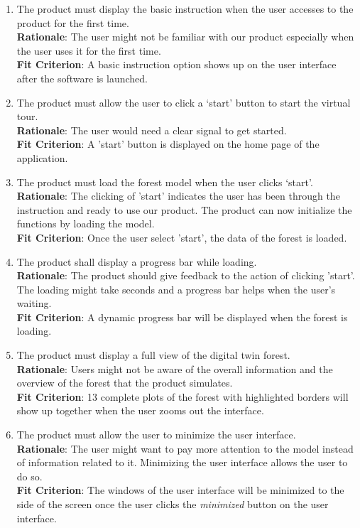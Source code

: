 \documentclass{article}
\begin{document}
\begin{enumerate}[FR1]
	\item The product must display the basic instruction when the user accesses to the product for the first time.\\
	\textbf{Rationale}: The user might not be familiar with our product especially when the user uses it for the first time.\\
	\textbf{Fit Criterion}: A basic instruction 
	option shows up on the user interface after the software is launched. 
	
	\item The product must allow the user to click a ‘start’ button to start the virtual tour.\\
	\textbf{Rationale}: The user would need a clear signal to get started.\\
	\textbf{Fit Criterion}: A 'start' button is displayed on the home page of the application.
	
	\item The product must load the forest model when the user clicks ‘start’.\\
	\textbf{Rationale}: The clicking of 'start' indicates the user has been through the instruction and ready to use our product. The product can now initialize the functions by loading the model.\\
	\textbf{Fit Criterion}: Once the user select 'start', the data of the forest is loaded.
	
	\item The product shall display a progress bar while loading. \\
	\textbf{Rationale}: The product should give feedback to the action of clicking 'start'. The loading might take seconds and a progress bar helps when the user's waiting. \\
	\textbf{Fit Criterion}: A dynamic progress bar will be displayed when the forest is loading.
	
	\item The product must display a full view of the digital twin forest.\\
	\textbf{Rationale}: Users might not be aware of the overall information and the overview of the forest that the product simulates.\\
	\textbf{Fit Criterion}: 13 complete plots of the forest with highlighted borders will show up together when the user zooms out the interface.
    
    \item The product must allow the user to minimize the user interface. \\
    \textbf{Rationale}: The user might want to pay more attention to the model instead of information related to it. Minimizing the user interface allows the user to do so. \\
	\textbf{Fit Criterion}: The windows of the user interface will be minimized to the side of the screen once the user clicks the \textit{minimized} button on the user interface.
	

\end{enumerate}
\end{document}
